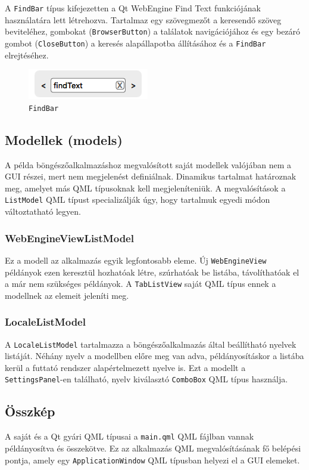 \documentclass[12pt]{report}
\begin{document}
A \texttt{FindBar} típus kifejezetten a Qt WebEngine Find Text funkciójának használatára
lett létrehozva. Tartalmaz egy szövegmezőt a keresendő szöveg beviteléhez, gombokat
(\texttt{BrowserButton}) a találatok navigációjához és egy bezáró gombot
(\texttt{CloseButton}) a keresés alapállapotba állításához és a \texttt{FindBar}
elrejtéséhez.
\begin{figure}[H]
    \centering
    \includegraphics[scale=0.8]{FindBar}
    \caption{
        \label{fig:find-bar}
        \texttt{FindBar}
    }
\end{figure}

\subsection{Modellek (models)}
A példa böngészőalkalmazáshoz megvalósított saját modellek valójában nem a GUI részei, mert
nem megjelenést definiálnak. Dinamikus tartalmat határoznak meg, amelyet más QML típusoknak
kell megjeleníteniük. A megvalósítások a \texttt{ListModel} QML típust specializálják úgy,
hogy tartalmuk egyedi módon változtatható legyen.

\subsubsection{WebEngineViewListModel}
Ez a modell az alkalmazás egyik legfontosabb eleme. Új \texttt{WebEngineView} példányok
ezen keresztül hozhatóak létre, szúrhatóak be listába, távolíthatóak el a már nem
szükséges példányok. A \texttt{TabListView} saját QML típus ennek a modellnek az elemeit
jeleníti meg.

\subsubsection{LocaleListModel}
A \texttt{LocaleListModel} tartalmazza a böngészőalkalmazás által beállítható nyelvek
listáját. Néhány nyelv a modellben előre meg van adva, példányosításkor a listába
kerül a futtató rendszer alapértelmezett nyelve is. Ezt a modellt a
\texttt{SettingsPanel}-en található, nyelv kiválasztó \texttt{ComboBox} QML típus használja.

\subsection{Összkép}
A saját és a Qt gyári QML típusai a \texttt{main.qml} QML fájlban vannak példányosítva és
összekötve. Ez az alkalmazás QML megvalósításának fő belépési pontja, amely egy
\texttt{ApplicationWindow} QML típusban helyezi el a GUI elemeket.
\end{document}
